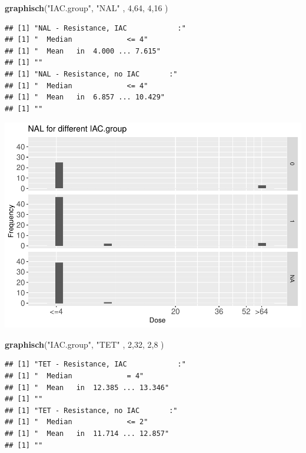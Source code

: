 \documentclass[
]{article}
\newenvironment{Shaded}{\begin{snugshade}}{\end{snugshade}}
\newcommand{\DecValTok}[1]{\textcolor[rgb]{0.00,0.00,0.81}{#1}}
\newcommand{\KeywordTok}[1]{\textcolor[rgb]{0.13,0.29,0.53}{\textbf{#1}}}
\newcommand{\NormalTok}[1]{#1}
\newcommand{\StringTok}[1]{\textcolor[rgb]{0.31,0.60,0.02}{#1}}
\begin{document}
\begin{Shaded}
\begin{Highlighting}[]
   \KeywordTok{graphisch}\NormalTok{(}\StringTok{"IAC.group"}\NormalTok{, }\StringTok{"NAL"}\NormalTok{ , }\DecValTok{4}\NormalTok{,}\DecValTok{64}\NormalTok{,   }\DecValTok{4}\NormalTok{,}\DecValTok{16}\NormalTok{    ) }
\end{Highlighting}
\end{Shaded}

\begin{verbatim}
## [1] "NAL - Resistance, IAC            :"
## [1] "  Median             <= 4"
## [1] "  Mean   in  4.000 ... 7.615"
## [1] ""
## [1] "NAL - Resistance, no IAC       :"
## [1] "  Median             <= 4"
## [1] "  Mean   in  6.857 ... 10.429"
## [1] ""
\end{verbatim}

\includegraphics{Verteilungen_files/figure-latex/unnamed-chunk-14-1.pdf}

\begin{Shaded}
\begin{Highlighting}[]
   \KeywordTok{graphisch}\NormalTok{(}\StringTok{"IAC.group"}\NormalTok{, }\StringTok{"TET"}\NormalTok{ , }\DecValTok{2}\NormalTok{,}\DecValTok{32}\NormalTok{,   }\DecValTok{2}\NormalTok{,}\DecValTok{8}\NormalTok{    ) }
\end{Highlighting}
\end{Shaded}

\begin{verbatim}
## [1] "TET - Resistance, IAC            :"
## [1] "  Median             = 4"
## [1] "  Mean   in  12.385 ... 13.346"
## [1] ""
## [1] "TET - Resistance, no IAC       :"
## [1] "  Median             <= 2"
## [1] "  Mean   in  11.714 ... 12.857"
## [1] ""
\end{verbatim}
\end{document}
